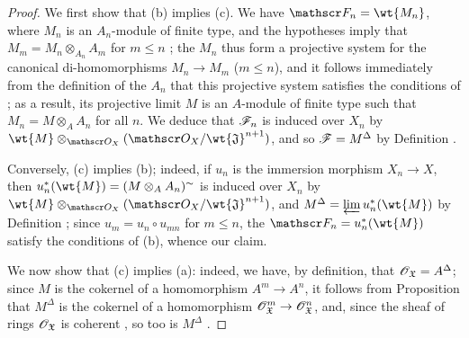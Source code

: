 \begin{proof}
\label{proof-1.10.10.5}
We first show that (b) implies (c).
We have $\sh{F}_n=\wt{M_n}$, where $M_n$ is an $A_n$-module of finite type, and the hypotheses imply that $M_m=M_n\otimes_{A_n}A_m$ for $m\leq n$ ; the $M_n$ thus form a projective system for the canonical di-homomorphisms $M_n\to M_m$ ($m\leq n$), and it follows immediately from the definition of the $A_n$ that this projective system satisfies the conditions of ; as a result, its projective limit $M$ is an $A$-module of finite type such that $M_n=M\otimes_A A_n$ for all $n$.
We deduce that $\mathscr{F}_n$ is induced over $X_n$ by $\wt{M}\otimes_{\sh{O}_X}(\sh{O}_X/\wt{\mathfrak{J}}^{n+1})$, and so $\mathscr{F}=M^\Delta$ by Definition .

Conversely, (c) implies (b); indeed, if $u_n$ is the immersion morphism $X_n\to X$, then $u_n^*(\wt{M})=(M\otimes_A A_n)^\sim$ is induced over $X_n$ by $\wt{M}\otimes_{\sh{O}_X}(\sh{O}_X/\wt{\mathfrak{J}}^{n+1})$, and $M^\Delta=\varprojlim u_n^*(\wt{M})$ by Definition ; since $u_m=u_n\circ u_{mn}$ for $m\leq n$, the $\sh{F}_n=u_n^*(\wt{M})$ satisfy the conditions of (b), whence our claim.

We now show that (c) implies (a): indeed, we have, by definition, that $\mathscr{O}_\mathfrak{X}=A^\Delta$; since $M$ is the cokernel of a homomorphism $A^m\to A^n$, it follows from Proposition  that $M^\Delta$ is the cokernel of a homomorphism $\sh{O}_\mathfrak{X}^m\to\sh{O}_\mathfrak{X}^n$, and, since the sheaf of rings $\mathscr{O}_\mathfrak{X}$ is coherent , so too is $M^\Delta$ .


\end{proof}
